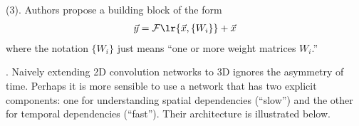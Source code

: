 \documentclass[11pt]{article}
\begin{document}


 (3). Authors propose a building block of the form 
\begin{align}
	\vec y = \mathcal{F}\lr{ \vec x , \{ W_i \}  } + \vec x
\end{align}
where the notation $\{ W_i \}$ just means ``one or more weight matrices $W_i$.''








. Naively extending 2D convolution networks to 3D ignores the asymmetry of time. Perhaps it is more sensible to use a network that has two explicit components: one for understanding spatial dependencies (``slow'') and the other for temporal dependencies (``fast''). Their architecture is illustrated below.

\end{document}
